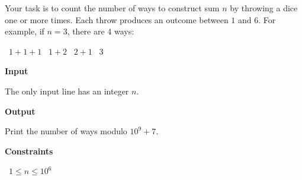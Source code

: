 Your task is to count the number of ways to construct sum $n$ by throwing a dice one or more times. Each throw produces an outcome between $1$ and  $6$.
For example, if $n=3$, there are $4$ ways:

\textbullet\ $1+1+1$
\textbullet\ $1+2$
\textbullet\ $2+1$
\textbullet\ $3$

\vspace{0.3cm}\noindent\textbf{Input}

The only input line has an integer $n$.

\vspace{0.3cm}\noindent\textbf{Output}

Print the number of ways modulo $10^9+7$.

\vspace{0.3cm}\noindent\textbf{Constraints}

\textbullet\ $1 \le n \le 10^6$